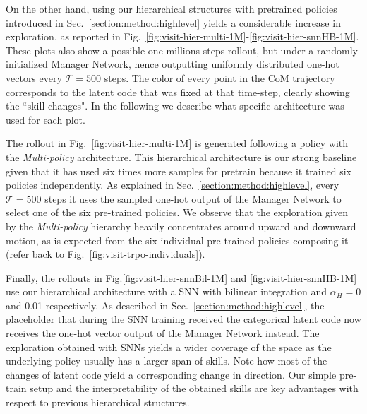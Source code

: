 \documentclass{article} %
\begin{document}
On the other hand, using our hierarchical structures with pretrained policies introduced in Sec.\ \ref{section:method:highlevel} yields a considerable increase in exploration, as reported in Fig.\ \ref{fig:visit-hier-multi-1M}-\ref{fig:visit-hier-snnHB-1M}. These plots also show a possible one millions steps rollout, but under a randomly initialized Manager Network, hence outputting uniformly distributed one-hot vectors every $\mathcal{T}=500$ steps. The color of every point in the CoM trajectory corresponds to the latent code that was fixed at that time-step, clearly showing the ``skill changes". In the following we describe what specific architecture was used for each plot.

The rollout in Fig.\ \ref{fig:visit-hier-multi-1M} is generated following a policy with the \textit{Multi-policy} architecture. This hierarchical architecture is our strong baseline given that it has used six times more samples for pretrain because it trained six policies independently. As explained in Sec.\ \ref{section:method:highlevel}, every $\mathcal{T}=500$ steps it uses the sampled one-hot output of the Manager Network to select one of the six pre-trained policies. We observe that the exploration given by the \textit{Multi-policy} hierarchy heavily concentrates around upward and downward motion, as is expected from the six individual pre-trained policies composing it (refer back to Fig.\ \ref{fig:visit-trpo-individuals}). 

Finally, the rollouts in Fig.\ref{fig:visit-hier-snnBil-1M} and \ref{fig:visit-hier-snnHB-1M} use our hierarchical architecture with a SNN with bilinear integration and $\alpha_H= 0$ and 0.01 respectively. As described in Sec.\ \ref{section:method:highlevel}, the placeholder that during the SNN training received the categorical latent code now receives the one-hot vector output of the Manager Network instead. The exploration obtained with SNNs yields a wider coverage of the space as the underlying policy usually has a larger span of skills. Note how most of the changes of latent code yield a corresponding change in direction. Our simple pre-train setup and the interpretability of the obtained skills are key advantages with respect to previous hierarchical structures. %
\end{document}
